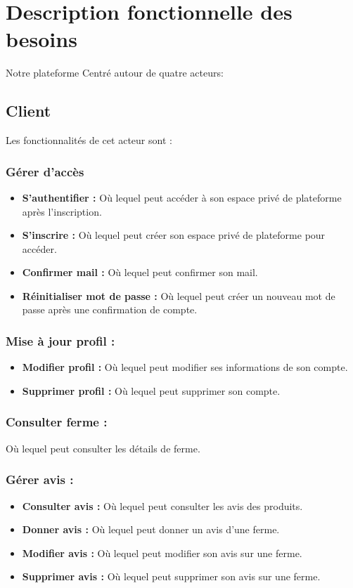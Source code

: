 \documentclass[16pt,fleqn]{article} %
\begin{document}
\section{Description fonctionnelle des besoins}
Notre plateforme Centré autour de quatre acteurs:


\subsection{Client}
Les fonctionnalités de cet acteur sont :
\subsubsection{Gérer d'accès}
\begin{itemize}
    \item \textbf{S'authentifier :} Où lequel peut accéder à son espace privé de plateforme après l'inscription.
    \item \textbf{S'inscrire :} Où lequel peut créer son espace privé de plateforme pour accéder.
    \item \textbf{Confirmer mail :} Où lequel peut confirmer son mail.
    \item \textbf{Réinitialiser mot de passe :} Où lequel peut créer un nouveau mot de passe après une confirmation de compte.
\end{itemize}
\subsubsection{Mise à jour profil :}
\begin{itemize}
    \item \textbf{Modifier profil :} Où lequel peut modifier ses informations de son compte.
    \item \textbf{Supprimer profil :} Où lequel peut supprimer son compte.
\end{itemize}

\subsubsection{Consulter ferme :}
Où lequel peut consulter les détails de ferme.

\subsubsection{Gérer avis :}
\begin{itemize}
    \item \textbf{Consulter avis :} Où lequel peut consulter les avis des produits.
    \item \textbf{Donner avis :} Où lequel peut donner un avis d'une ferme.
    \item \textbf{Modifier avis :} Où lequel peut modifier son avis sur une ferme.
    \item \textbf{Supprimer avis :} Où lequel peut supprimer son avis sur une ferme.
\end{itemize}
\end{document}
